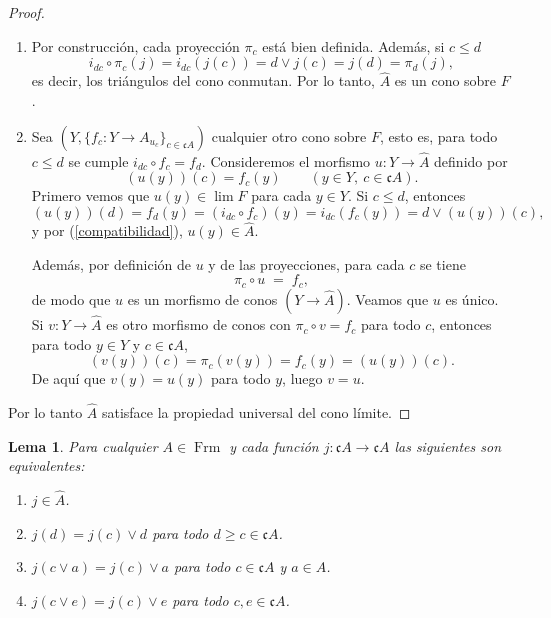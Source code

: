 \documentclass[11pt]{amsart}
\DeclareMathOperator{\Frm}{Frm}
\theoremstyle{plain}
\newtheorem{lem}[thm]{Lema}
\theoremstyle{definition}
\begin{document}
\begin{proof}
\begin{enumerate}
    \item Por construcción, cada proyección $\pi_c$ está bien definida. Además, si $c\leq d$
    \[
    i_{dc}\circ \pi_c(j)=i_{dc}(j(c))= d\vee j(c)=j(d)= \pi_d(j),
    \]
es decir, los triángulos del cono conmutan. Por lo tanto, $\hat{A}$ es un cono sobre $F$.

\item Sea $(Y,\{f_c\colon Y\to A_{u_c}\}_{c\in \mathfrak{c}A})$ cualquier otro cono sobre $F$, esto es,
para todo $c\le d$ se cumple $i_{dc}\circ f_c=f_d$. 
Consideremos el morfismo $u:Y\to \hat{A}$ definido por
\[
(u(y))(c)=f_c(y)\qquad (y\in Y,\ c\in \mathfrak{c}A).
\]
Primero vemos que $u(y)\in\lim F$ para cada $y\in Y$. Si $c\le d$, entonces
\[
(u(y))(d)=f_d(y)=(i_{dc}\circ f_c)(y)=i_{dc}(f_c(y))
=d\vee(u(y))(c),
\]
y por (\ref{compatibilidad}), $u(y)\in \hat{A}.$

Además, por definición de $u$ y de las proyecciones, para cada $c$ se tiene
\[
\pi_c\circ u \;=\; f_c,
\]
de modo que $u$ es un morfismo de conos $(Y\to \hat{A})$. Veamos que $u$ es único.\\

Si $v\colon Y\to \hat{A}$ es otro morfismo de conos con 
$\pi_c\circ v = f_c$ para todo $c$, entonces para todo $y\in Y$ y $c\in\mathfrak{c}A$,
\[
(v(y))(c)=\pi_c(v(y))=f_c(y)=(u(y))(c).
\]
De aquí que $v(y)=u(y)$ para todo $y$, luego $v=u$.
\end{enumerate}
Por lo tanto $\hat{A}$ satisface la propiedad universal del cono límite.
\end{proof}

\begin{lem}\label{Lema3.1}
    Para cualquier $A\in \Frm$ y cada función $j\colon \mathfrak{c}A\to \mathfrak{c}A$ las siguientes son equivalentes:
    \begin{enumerate}
        \item $j\in \hat{A}$.
        \item $j(d)=j(c)\vee d$ para todo $d\geq c\in \mathfrak{c}A$.
        \item $j(c\vee a)=j(c)\vee a$ para todo $c\in \mathfrak{c}A$ y $a\in A$.
        \item $j(c\vee e)=j(c)\vee e$ para todo $c, e\in \mathfrak{c}A$.
    \end{enumerate}
\end{lem}
\end{document}
